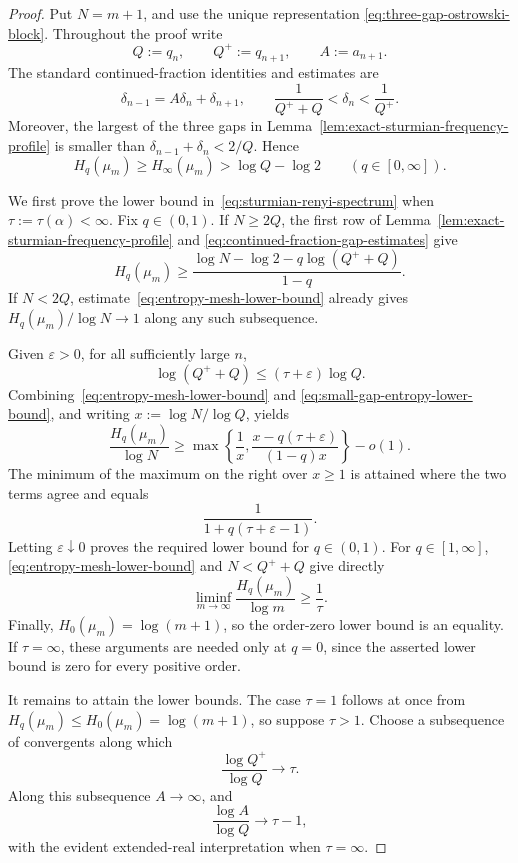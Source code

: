 \begin{proof}
Put \(N=m+1\), and use the unique representation
\eqref{eq:three-gap-ostrowski-block}. Throughout the proof write
\[
Q:=q_n,\qquad Q^+:=q_{n+1},\qquad A:=a_{n+1}.
\]
The standard continued-fraction identities and estimates are
\begin{equation}\label{eq:continued-fraction-gap-estimates}
\delta_{n-1}=A\delta_n+\delta_{n+1},\qquad
\frac{1}{Q^++Q}<\delta_n<\frac{1}{Q^+}.
\end{equation}
Moreover, the largest of the three gaps in
Lemma~\ref{lem:exact-sturmian-frequency-profile} is smaller than
\(\delta_{n-1}+\delta_n<2/Q\). Hence
\begin{equation}\label{eq:entropy-mesh-lower-bound}
H_q(\mu_m)\ge H_\infty(\mu_m)>\log Q-\log2
\qquad(q\in[0,\infty]).
\end{equation}

We first prove the lower bound in~\eqref{eq:sturmian-renyi-spectrum} when
\(\tau:=\tau(\alpha)<\infty\). Fix \(q\in(0,1)\). If \(N\ge2Q\), the first
row of Lemma~\ref{lem:exact-sturmian-frequency-profile} and
\eqref{eq:continued-fraction-gap-estimates} give
\begin{equation}\label{eq:small-gap-entropy-lower-bound}
H_q(\mu_m)
\ge
\frac{\log N-\log2-q\log(Q^++Q)}{1-q}.
\end{equation}
If \(N<2Q\), estimate~\eqref{eq:entropy-mesh-lower-bound} already gives
\(H_q(\mu_m)/\log N\to1\) along any such subsequence.

Given \(\varepsilon>0\), for all sufficiently large \(n\),
\[
\log(Q^++Q)\le(\tau+\varepsilon)\log Q.
\]
Combining~\eqref{eq:entropy-mesh-lower-bound} and
\eqref{eq:small-gap-entropy-lower-bound}, and writing
\(x:=\log N/\log Q\), yields
\[
\frac{H_q(\mu_m)}{\log N}
\ge
\max\left\{
\frac1x,
\frac{x-q(\tau+\varepsilon)}{(1-q)x}
\right\}-o(1).
\]
The minimum of the maximum on the right over \(x\ge1\) is attained where
the two terms agree and equals
\[
\frac{1}{1+q(\tau+\varepsilon-1)}.
\]
Letting \(\varepsilon\downarrow0\) proves the required lower bound for
\(q\in(0,1)\). For \(q\in[1,\infty]\),
\eqref{eq:entropy-mesh-lower-bound} and \(N<Q^++Q\) give directly
\[
\liminf_{m\to\infty}\frac{H_q(\mu_m)}{\log m}\ge\frac1\tau.
\]
Finally, \(H_0(\mu_m)=\log(m+1)\), so the order-zero lower bound is an
equality. If \(\tau=\infty\), these arguments are needed only at \(q=0\),
since the asserted lower bound is zero for every positive order.

It remains to attain the lower bounds. The case \(\tau=1\) follows at once
from \(H_q(\mu_m)\le H_0(\mu_m)=\log(m+1)\), so suppose \(\tau>1\). Choose
a subsequence of convergents along which
\[
\frac{\log Q^+}{\log Q}\longrightarrow\tau.
\]
Along this subsequence \(A\to\infty\), and
\begin{equation}\label{eq:partial-quotient-log-scale}
\frac{\log A}{\log Q}\longrightarrow\tau-1,
\end{equation}
with the evident extended-real interpretation when \(\tau=\infty\).


\end{proof}
